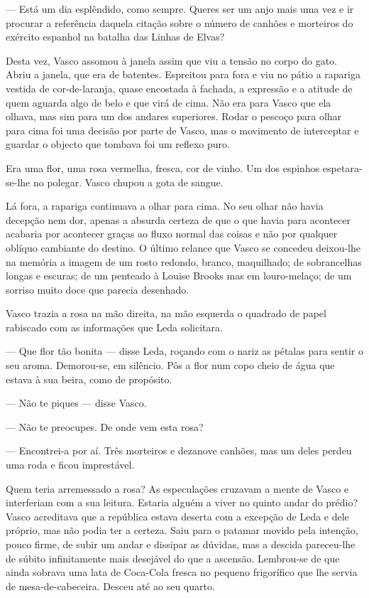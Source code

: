 --- Está um dia esplêndido, como sempre. Queres ser um anjo mais uma vez
e ir procurar a referência daquela citação sobre o número de canhões e
morteiros do exército espanhol na batalha das Linhas de Elvas?

Desta vez, Vasco assomou à janela assim que viu a tensão no corpo do
gato. Abriu a janela, que era de batentes. Espreitou para fora e viu
no pátio a rapariga vestida de cor-de-laranja, quase encostada à fachada, a expressão e a atitude de quem
aguarda algo de belo e que virá de cima. Não era para Vasco que ela
olhava, mas sim para um dos andares superiores. Rodar o pescoço para
olhar para cima foi uma decisão por parte de Vasco, mas o movimento de
interceptar e guardar o objecto que tombava foi um reflexo puro.

Era uma flor, uma rosa vermelha, fresca, cor de vinho. Um dos espinhos
espetara-se-lhe no polegar. Vasco chupou a gota de sangue.

Lá fora, a rapariga continuava a olhar para cima. No seu olhar não havia
decepção nem dor, apenas a absurda certeza de que o que havia para
acontecer acabaria por acontecer graças ao fluxo normal das coisas e não
por qualquer oblíquo cambiante do destino. O último relance que Vasco se
concedeu deixou-lhe na memória a imagem de um rosto redondo, branco,
maquilhado; de sobrancelhas longas e escuras; de um penteado à Louise
Brooks mas em louro-melaço; de um sorriso muito doce que parecia
desenhado.

Vasco trazia a rosa na mão direita, na mão esquerda o quadrado de papel
rabiscado com as informações que Leda solicitara.

--- Que flor tão bonita --- disse Leda, roçando com o nariz
as pétalas para sentir o seu aroma. Demorou-se, em silêncio. Pôs a flor
num copo cheio de água que estava à sua beira, como de propósito.

--- Não te piques --- disse Vasco.

--- Não te preocupes. De onde vem esta rosa?

--- Encontrei-a por aí. Três morteiros e dezanove canhões, mas um deles
  perdeu uma roda e ficou imprestável.

Quem teria arremessado a rosa? As especulações cruzavam a mente de
Vasco e interferiam com a sua leitura. Estaria alguém a viver no quinto
andar do prédio? Vasco acreditava que a república estava deserta com a
excepção de Leda e dele próprio, mas não podia ter a certeza. Saiu para
o patamar movido pela intenção, pouco firme, de subir um andar e
dissipar as dúvidas, mas a descida pareceu-lhe de súbito infinitamente
mais desejável do que a ascensão. Lembrou-se de que ainda sobrava uma
lata de Coca-Cola fresca no pequeno frigorífico que lhe servia de
mesa-de-cabeceira. Desceu até ao seu quarto.

